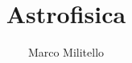 \documentclass[a4paper,11pt]{report}
\begin{document}
    \pagecolor{black}
    \color{white}

	\date{}
	\author{Marco Militello}
	\title{Astrofisica}
	\maketitle
	\tableofcontents
	\newpage
	




\end{document}
